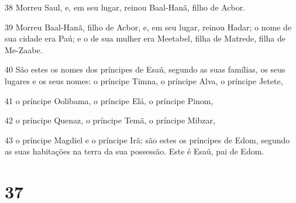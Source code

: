 \par 38 Morreu Saul, e, em seu lugar, reinou Baal-Hanã, filho de Acbor.
\par 39 Morreu Baal-Hanã, filho de Acbor, e, em seu lugar, reinou Hadar; o nome de sua cidade era Paú; e o de sua mulher era Meetabel, filha de Matrede, filha de Me-Zaabe.
\par 40 São estes os nomes dos príncipes de Esaú, segundo as suas famílias, os seus lugares e os seus nomes: o príncipe Timna, o príncipe Alva, o príncipe Jetete,
\par 41 o príncipe Oolibama, o príncipe Elá, o príncipe Pinom,
\par 42 o príncipe Quenaz, o príncipe Temã, o príncipe Mibzar,
\par 43 o príncipe Magdiel e o príncipe Irã; são estes os príncipes de Edom, segundo as suas habitações na terra da sua possessão. Este é Esaú, pai de Edom.

\chapter{37}

